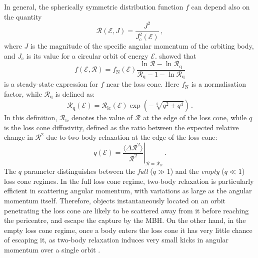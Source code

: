 \documentclass[desactivate]{aa}
\begin{document}
        In general, the spherically symmetric distribution function $f$ can depend also on the quantity
        \begin{equation}
                \mathcal{R} (\mathcal{E}, J ) = \frac{J^2}{J^2_\mathrm{c} (\mathcal{E})} \, ,
        \end{equation}
        where $J$ is the magnitude of the specific angular momentum of the orbiting body, and $J_\mathrm{c}$ is its value for a circular orbit of energy $\mathcal{E}$.
        \citet{1978ApJ...226.1087C} showed that
        \begin{equation}
            f(\mathcal{E}, \mathcal{R}) = f_\mathrm{N} (\mathcal{E} ) \frac{\ln \mathcal{R} - \ln \mathcal{R}_\mathrm{q}}{\mathcal{R}_\mathrm{q} -1 - \ln \mathcal{R}_\mathrm{q}}
        \end{equation}
        is a steady-state expression for $f$ near the loss cone. Here $f_\mathrm{N}$ is a normalisation factor, while $\mathcal{R}_\mathrm{q}$ is defined as:
        \begin{equation}
            \mathcal{R}_\mathrm{q} (\mathcal{E}) = \mathcal{R}_\mathrm{lc} (\mathcal{E} ) \exp \left(-\sqrt[4]{q^2+q^4} \right) \, .
        \end{equation}
        In this definition, $\mathcal{R}_\mathrm{lc}$ denotes the value of $\mathcal{R}$ at the edge of the loss cone, while $q$ is the loss cone diffusivity, defined as the ratio between the expected relative change in $\mathcal{R}^2$ due to two-body relaxation at the edge of the loss cone:
        \begin{equation}
            q ( \mathcal{E} ) = \left.\frac{\langle \Delta \mathcal{R}^2 \rangle}{\mathcal{R}^2}\right\rvert_{\mathcal{R} = \mathcal{R}_\mathrm{lc}} \, .
        \end{equation}
        The $q$ parameter distinguishes between the \textit{full} ($q \gg 1$) and the \textit{empty} ($q \ll 1$) loss cone regimes. In the full loss cone regime, two-body relaxation is particularly efficient in scattering angular momentum, with variations as large as the angular momentum itself. Therefore, objects instantaneously located on an orbit penetrating the loss cone are likely to be scattered away from it before reaching the pericentre, and escape the capture by the MBH. On the other hand, in the empty loss cone regime, once a body enters the loss cone it has very little chance of escaping it, as two-body relaxation induces very small kicks in angular momentum over a single orbit \citep{1978ApJ...226.1087C, 2013degn.book.....M}.
\end{document}
